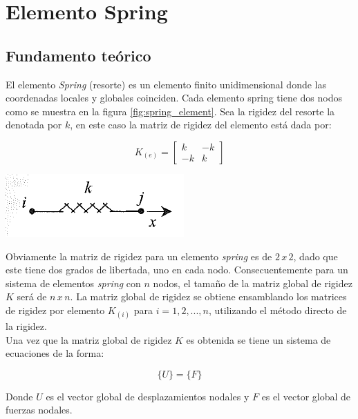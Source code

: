 \chapter{Elemento Spring}

\section{Fundamento teórico}

El elemento \textit{Spring} (resorte) es un elemento finito unidimensional donde 
las coordenadas locales y globales coinciden. Cada elemento spring tiene dos 
nodos como se muestra en la figura \ref{fig:spring_element}. Sea la rigidez del 
resorte la denotada por $k$, en este caso la matriz de rigidez del elemento está 
dada por:

\begin{equation}
K_{(e)} = \begin{bmatrix}
k & -k \\
-k & k 
\end{bmatrix}
\end{equation}

\begin{center}
\includegraphics[scale=0.8]{src/spring-element/spring_element.png}
\label{fig:spring_element}
\end{center}

Obviamente la matriz de rigidez para un elemento \textit{spring} es de $2\,x\,2$, dado que 
este tiene dos grados de libertada, uno en cada nodo. Consecuentemente para un 
sistema de elementos \textit{spring} con $n$ nodos, el tamaño de la matriz global de 
rigidez $K$ será de $n\,x\,n$. La matriz global de rigidez se obtiene ensamblando 
los matrices de rigidez por elemento $K_{(i)}$ para $i=1,2,...,n$, utilizando el método 
directo de la rigidez.\\

Una vez que la matriz global de rigidez $K$ es obtenida  se tiene un sistema de ecuaciones 
de la forma:

\begin{equation}
[K]\{U\} = \{F\}
\end{equation}

Donde $U$ es el vector global de desplazamientos nodales y $F$ es el vector global de 
fuerzas nodales.\\

